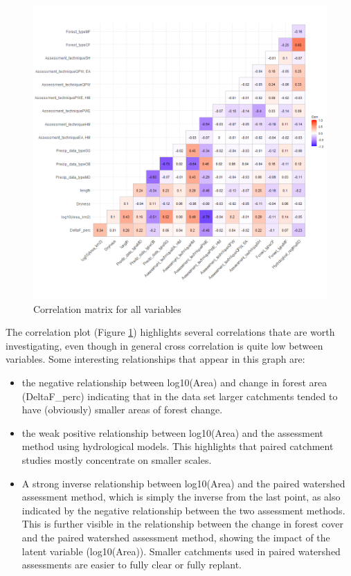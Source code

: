 \documentclass[]{elsarticle} %
\providecommand{\tightlist}{%
  \setlength{\itemsep}{0pt}\setlength{\parskip}{0pt}}
\begin{document}
\begin{figure}
\includegraphics[width=0.9\linewidth]{variable_corr_plot} \caption{Correlation matrix for all variables}\label{fig:corgraphs}
\end{figure}

The correlation plot (Figure \ref{fig:corgraphs}) highlights several correlations thate are worth investigating, even though in general cross correlation is quite low between variables. Some interesting relationships that appear in this graph are:

\begin{itemize}
\tightlist
\item
  the negative relationship between log10(Area) and change in forest area (DeltaF\_perc) indicating that in the data set larger catchments tended to have (obviously) smaller areas of forest change.\\
\item
  the weak positive relationship between log10(Area) and the assessment method using hydrological models. This highlights that paired catchment studies mostly concentrate on smaller scales.\\
\item
  A strong inverse relationship between log10(Area) and the paired watershed assessment method, which is simply the inverse from the last point, as also indicated by the negative relationship between the two assessment methods. This is further visible in the relationship between the change in forest cover and the paired watershed assessment method, showing the impact of the latent variable (log10(Area)). Smaller catchments used in paired watershed assessments are easier to fully clear or fully replant.
\end{itemize}
\end{document}
